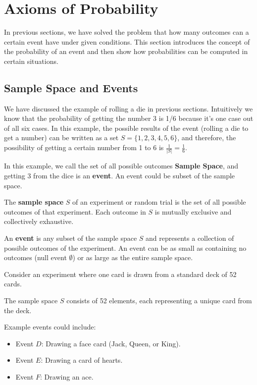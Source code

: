     
    \section{Axioms of Probability}
    In previous sections, we have solved the problem that how many outcomes can a certain event have under
    given conditions. This section introduces the concept of the probability of an event and then
    show how probabilities can be computed in certain situations. 

    \subsection{Sample Space and Events}
    We have discussed the example of rolling a die in previous sections. Intuitively we know that
    the probability of getting the number 3 is 1/6 because it's one case out of all six cases. In 
    this example, the possible results of the event (rolling a die to get a number) can be written
    as a set $S = \{1,2,3,4,5,6\}$, and therefore, the possibility of getting a certain number 
    from 1 to 6 is $\frac{1}{|S|} = \frac{1}{6}$.

    In this example, we call the set of all possible outcomes \textbf{Sample Space}, and getting
    3 from the dice is an \textbf{event}. An event could be subset of the sample space.

    \begin{definition}
        The \textbf{sample space} $S$ of an experiment or random trial is the set of all possible outcomes of that experiment. Each outcome in $S$ is mutually exclusive and collectively exhaustive.
    \end{definition}

    \begin{definition}[Event]
        An \textbf{event} is any subset of the sample space $S$ and represents a collection of possible outcomes of the experiment. An event can be as small as containing no outcomes (null event $\emptyset$) or as large as the entire sample space.
    \end{definition}

    \begin{example}
        Consider an experiment where one card is drawn from a standard deck of 52 cards.

        The sample space \( S \) consists of 52 elements, each representing a unique card from the deck.
        
        Example events could include:
        \begin{itemize}
        \item Event \( D \): Drawing a face card (Jack, Queen, or King).
        \item Event \( E \): Drawing a card of hearts.
        \item Event \( F \): Drawing an ace.
        \end{itemize}
    \end{example}

